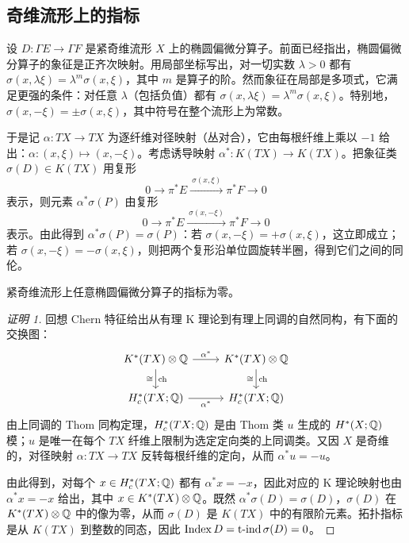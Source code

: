 \subsection{奇维流形上的指标}

设 $D:\Gamma E\to\Gamma F$ 是紧奇维流形 $X$ 上的椭圆偏微分算子。前面已经指出，椭圆偏微分算子的象征是正齐次映射。用局部坐标写出，对一切实数 $\lambda>0$ 都有 $\sigma(x,\lambda\xi)=\lambda^m\sigma(x,\xi)$，其中 $m$ 是算子的阶。然而象征在局部是多项式，它满足更强的条件：对任意 $\lambda$（包括负值）都有 $\sigma(x,\lambda\xi)=\lambda^m\sigma(x,\xi)$。特别地，$\sigma(x,-\xi)=\pm\sigma(x,\xi)$，其中符号在整个流形上为常数。

于是记 $\alpha:TX\to TX$ 为逐纤维对径映射（丛对合），它由每根纤维上乘以 $-1$ 给出：$\alpha:(x,\xi)\mapsto(x,-\xi)$。考虑诱导映射 $\alpha^*:K(TX)\to K(TX)$。把象征类 $\sigma(D)\in K(TX)$ 用复形
\[
0\to\pi^*E\xrightarrow{\ \sigma(x,\xi)\ }\pi^*F\to 0
\]
表示，则元素 $\alpha^*\sigma(P)$ 由复形
\[
0\to\pi^*E\xrightarrow{\ \sigma(x,-\xi)\ }\pi^*F\to 0
\]
表示。由此得到 $\alpha^*\sigma(P)=\sigma(P)$：若 $\sigma(x,-\xi)=+\sigma(x,\xi)$，这立即成立；若 $\sigma(x,-\xi)=-\sigma(x,\xi)$，则把两个复形沿单位圆旋转半圈，得到它们之间的同伦。


\begin{theorem}
紧奇维流形上任意椭圆偏微分算子的指标为零。
\end{theorem}

\begin{proof}[证明 1]
回想 Chern 特征给出从有理 K 理论到有理上同调的自然同构，有下面的交换图：
\[
\begin{tikzcd}
K^*(TX)\otimes\Q \arrow[r,"\alpha^*"] \arrow[d,"\ch"{right},"\cong"{left}]
  & K^*(TX)\otimes\Q \arrow[d,"\ch"{right},"\cong"{left}] \\
H^*_c(TX;\Q) \arrow[r,"\alpha^*"']
  & H^*_c(TX;\Q)
\end{tikzcd}
\]
由上同调的 Thom 同构定理，$H^*_c(TX;\mathbb{Q})$ 是由 Thom 类 $u$ 生成的 $H^*(X;\mathbb{Q})$ 模；$u$ 是唯一在每个 $TX$ 纤维上限制为选定定向类的上同调类。又因 $X$ 是奇维的，对径映射 $\alpha:TX\to TX$ 反转每根纤维的定向，从而 $\alpha^*u=-u$。


由此得到，对每个 $x\in H^*_c(TX;\mathbb{Q})$ 都有 $\alpha^*x=-x$，因此对应的 K 理论映射也由 $\alpha^*x=-x$ 给出，其中 $x\in K^*(TX)\otimes\mathbb{Q}$。既然 $\alpha^*\sigma(D)=\sigma(D)$，$\sigma(D)$ 在 $K^*(TX)\otimes\mathbb{Q}$ 中的像为零，从而 $\sigma(D)$ 是 $K(TX)$ 中的有限阶元素。拓扑指标是从 $K(TX)$ 到整数的同态，因此 $\operatorname{Index} D=\operatorname{t\text{-}ind}\sigma(D)=0$。
\end{proof}

